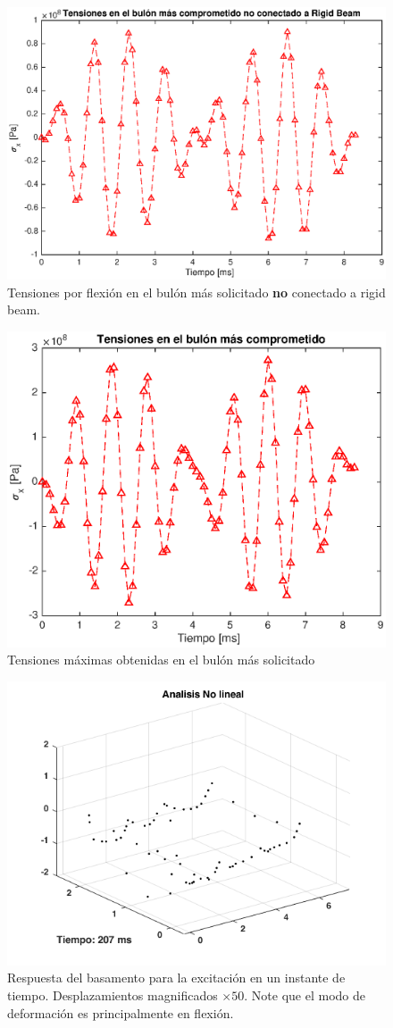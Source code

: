 \documentclass[onecolumn,10pt,titlepage,a4paper]{article}
\begin{document}
\begin{figure}[htb!]
	\centering
	\includegraphics[width=.8\textwidth]{fig/tensionBulon.eps}
	
	\caption{Tensiones por flexión en el bulón más solicitado \textbf{no} conectado a rigid beam.}
	\label{fig:tensionBulon}
\end{figure}

\begin{figure}[htb!]
	\centering
	\includegraphics[width=.7\textwidth]{fig/tensionBulonRigid.eps}
	\caption{Tensiones máximas obtenidas en el bulón más solicitado}
	\label{fig:tensionBulonRigid}
\end{figure}

\begin{figure}[htb!]
	\centering
	\includegraphics[width=.7\textwidth]{fig/analisisNoLineal.png}
	\caption{Respuesta del basamento para la excitación en un instante de tiempo. Desplazamientos magnificados $\times 50$. Note que el modo de deformación es principalmente en flexión.}
	\label{fig:NoLineal}
\end{figure}


 
\end{document}
